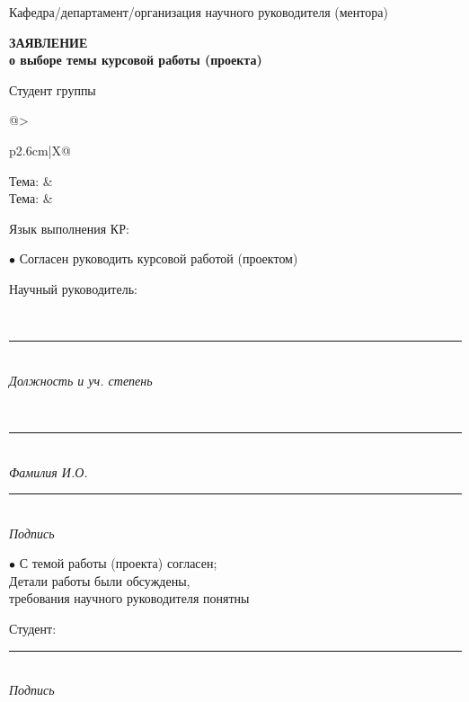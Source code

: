 \documentclass[12pt,a4paper]{article}
\newcommand{\hseSignField}[2]{%
  \begin{minipage}[t]{#1}\centering
    \rule{\linewidth}{0.4pt}\\[-2pt]{\footnotesize\itshape #2}
  \end{minipage}}
\newcommand{\hseFilledField}[3]{%
  \begin{minipage}[t]{#1}\centering
    {\small\strut #2}\\[-4pt]\rule{\linewidth}{0.4pt}\\[-2pt]{\footnotesize\itshape #3}
  \end{minipage}}
\begin{document}
\vspace{0.6cm}
\begin{minipage}[t]{0.5\textwidth}\raggedright
\small Кафедра/департамент/организация научного руководителя (ментора)\\
\hseSupervisorDepartment
\end{minipage}

\vspace{0.6cm}
\begin{center}
\textbf{ЗАЯВЛЕНИЕ}\\
\textbf{о выборе темы курсовой работы (проекта)}
\end{center}

\vspace{0.4cm}
Студент \underline{\makebox[9cm][l]{\ \hseAuthorName}} группы \underline{\makebox[3cm][l]{\ \hseGroup}}

\vspace{0.6cm}
\renewcommand{\arraystretch}{1.3}
\begin{tabularx}{\textwidth}{@{}>{\raggedright\arraybackslash}p{2.6cm}|X@{}}
Тема: & \hseTitleRu \\[0.6cm]
Тема: & \foreignlanguage{english}{\hseTitleEn} \\
\end{tabularx}

\vspace{0.6cm}
Язык выполнения КР: \underline{\makebox[4cm][l]{\ \hseWorkLang}}

\vspace{0.5cm}
$\bullet$ Согласен руководить курсовой работой (проектом)

\vspace{0.3cm}
\begin{minipage}[t]{0.27\textwidth}\raggedright Научный руководитель:\end{minipage}%
\hseFilledField{0.3\textwidth}{\hseSupervisorTitle\ifdefempty{\hseSupervisorDegree}{}{, \hseSupervisorDegree}}{Должность и уч. степень}\hfill
\hseFilledField{0.22\textwidth}{\hseSupervisorShortName}{Фамилия И.О.}\hfill
\hseSignField{0.15\textwidth}{Подпись}

\vspace{0.5cm}
\begin{minipage}[t]{0.55\textwidth}
$\bullet$ С темой работы (проекта) согласен;\\
Детали работы были обсуждены,\\
требования научного руководителя понятны
\end{minipage}\hfill
\begin{minipage}[t]{0.4\textwidth}
\vspace{0.5cm}
Студент: \hfill \hseSignField{0.5\textwidth}{Подпись}
\end{minipage}
\end{document}
